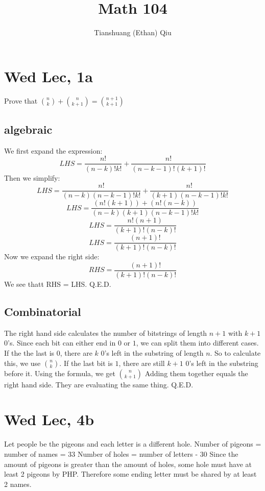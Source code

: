 \documentclass[12pt]{article}
\author{Tianshuang (Ethan) Qiu}
\begin{document}
\title{Math 104}
\maketitle

\section{Wed Lec, 1a}
Prove that $\binom{n}{k} + \binom{n}{k+1} = \binom{n+1}{k+1}$
\subsection{algebraic}
We first expand the expression:
$$LHS = \frac{n!}{(n-k)!k!} + \frac{n!}{(n-k-1)!(k+1)!}$$
Then we simplify:
$$LHS = \frac{n!}{(n-k)(n-k-1)!k!} + \frac{n!}{(k+1)(n-k-1)!k!}$$
$$LHS = \frac{(n!(k+1))+(n!(n-k))}{(n-k)(k+1)(n-k-1)!k!} $$
$$LHS = \frac{n!(n+1)}{(k+1)!(n-k)!} $$
$$LHS = \frac{(n+1)!}{(k+1)!(n-k)!}$$
Now we expand the right side:
$$RHS = \frac{(n+1)!}{(k+1)!(n-k)!}$$
We see thatt RHS = LHS.
\newline
Q.E.D.

\subsection{Combinatorial}
The right hand side calculates the number of bitstrings of length $n+1$ with $k+1$ 0's. Since each bit can either end in $0$ or $1$, we can split them into different cases.
\newline
If the the last is $0$, there are $k$ 0's left in the substring of length $n$. So to calculate this, we use $\binom{n}{k}$.
\newline
If the last bit is $1$, there are still $k+1$ 0's left in the substring before it. Using the formula, we get $\binom {n}{k+1}$
\newline
Adding them together equals the right hand side. They are evaluating the same thing.
\newline
Q.E.D.

\section{Wed Lec, 4b}
Let people be the pigeons and each letter is a different hole.
\newline
Number of pigeons = number of names = 33
\newline
Number of holes = number of letters - 30
\newline
Since the amount of pigeons is greater than the amount of holes, some hole must have at least 2 pigeons by PHP. Therefore some ending letter must be shared by at least 2 names.
\end{document}
